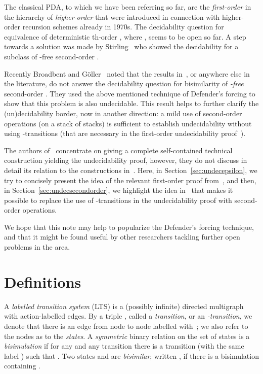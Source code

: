\documentclass[11pt]{article}
\newcommand{\pda}{\text{PDA}\xspace}
\newcommand{\dpda}{\text{DPDA}\xspace}
\begin{document}
The classical PDA, to which we have been referring so far, are
the \emph{first-order} \pda in the hierarchy of 
\emph{higher-order} \pda that were introduced 
in connection with higher-order recursion
schemes already in 1970s.
The decidability question for equivalence of deterministic
th-order \pda,
where ,
seems to be open so far. A step towards a solution was made by
Stirling~\cite{DBLP:conf/concur/Stirling06} who 
showed
the decidability for a subclass of 
-free
second-order \dpda.




Recently 
Broadbent and G{\"o}ller~\cite{DBLP:conf/fsttcs/BroadbentG12} 
noted that the results in~\cite{DBLP:journals/jacm/JancarS08}, or
anywhere else in the literature, do not answer the decidability question for
bisimilarity of \emph{-free} second-order \pda.
They used the above mentioned technique of Defender's
forcing to show that this problem is also undecidable.
This result helps to further 
clarify the (un)decidability border, now in another
direction:
a mild use of second-order operations 
(on a stack of stacks)
is sufficient 
to establish undecidability without using
-transitions (that are necessary in the first-order
undecidability proof~\cite{DBLP:journals/jacm/JancarS08}).


The authors of~\cite{DBLP:conf/fsttcs/BroadbentG12} concentrate on
giving a complete self-contained technical construction yielding the
undecidability proof, however, they do not discuss in detail its relation to the
constructions in~\cite{DBLP:journals/jacm/JancarS08}. 
Here, in Section~\ref{sec:undecepsilon},
we try to concisely  present the idea of the relevant first-order proof 
from~\cite{DBLP:journals/jacm/JancarS08}, 
and then, in Section~\ref{sec:undecsecondorder}, we highlight the
idea in~\cite{DBLP:conf/fsttcs/BroadbentG12} that makes it 
possible to replace
the use of -transitions 
in the undecidability proof
with second-order operations.


We hope that this note may help to popularize 
the Defender's forcing technique,
and that it might be found useful by other researchers
tackling further open problems in the area. 


\section{Definitions}\label{sec:definitions}

A \emph{labelled transition system} (LTS) is a 
(possibly infinite) directed multigraph with action-labelled
edges. By a triple , called a \emph{transition}, 
or an \emph{-transition},
we denote
that there is 
an edge from node  to node  labelled with \,;
we also refer to the nodes as
to the \emph{states}.
A \emph{symmetric} binary relation  on the set of states
is a \emph{bisimulation} if for any  and any 
transition  there is a transition  
(with the same label )
such that . Two states  and  are
\emph{bisimilar}, written , if there is a bisimulation
containing .
\end{document}

